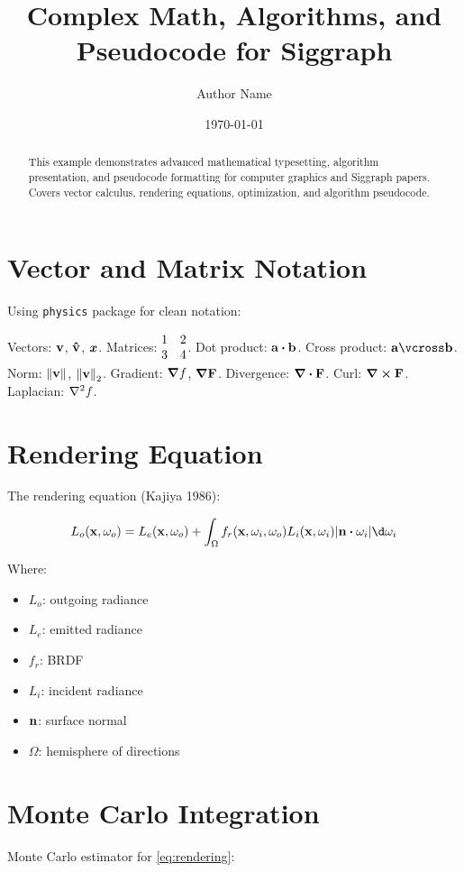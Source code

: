 \documentclass[12pt,a4paper]{article}
\title{Complex Math, Algorithms, and Pseudocode for Siggraph}
\author{Author Name}
\date{\today}
\begin{document}
\maketitle

\begin{abstract}
This example demonstrates advanced mathematical typesetting,
algorithm presentation, and pseudocode formatting for computer graphics
and Siggraph papers. Covers vector calculus, rendering equations,
optimization, and algorithm pseudocode.
\end{abstract}

\section{Vector and Matrix Notation}\label{sec:vectors}
Using \texttt{physics} package for clean notation:

Vectors: $\vb{v}$, $\vu{v}$, $\vb*{x}$.
Matrices: $\mqty{1 & 2 \\ 3 & 4}$.
Dot product: $\vb{a} \vdot \vb{b}$.
Cross product: $\vb{a} \vcross \vb{b}$.
Norm: $\norm{\vb{v}}$, $\norm{\vb{v}}_2$.
Gradient: $\grad f$, $\grad \vb{F}$.
Divergence: $\div \vb{F}$.
Curl: $\curl \vb{F}$.
Laplacian: $\laplacian f$.

\section{Rendering Equation}\label{sec:rendering}
The rendering equation (Kajiya 1986):

\begin{equation}\label{eq:rendering}
L_o(\vb{x}, \omega_o) = L_e(\vb{x}, \omega_o) + \int_{\Omega} f_r(\vb{x}, \omega_i, \omega_o) L_i(\vb{x}, \omega_i) \abs{\vb{n} \vdot \omega_i} \d\omega_i
\end{equation}

Where:
\begin{itemize}
    \item $L_o$: outgoing radiance
    \item $L_e$: emitted radiance
    \item $f_r$: BRDF
    \item $L_i$: incident radiance
    \item $\vb{n}$: surface normal
    \item $\Omega$: hemisphere of directions
\end{itemize}

\section{Monte Carlo Integration}\label{sec:mc}
Monte Carlo estimator for \cref{eq:rendering}:
\end{document}
